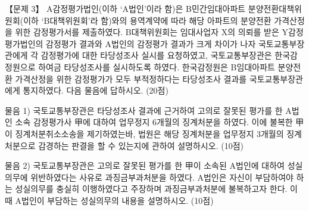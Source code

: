 \begin{longquestion}{【문제 3】}
A감정평가법인(이하 ‘A법인’이라 함)은 B민간임대아파트 분양전환대책위원회(이하 ‘B대책위원회’라 함)와의 용역계약에 따라 해당 아파트의 분양전환 가격산정을 위한 감정평가서를 제출하였다. B대책위원회는 임대사업자 X의 의뢰를 받은 Y감정평가법인의 감정평가 결과와 A법인의 감정평가 결과가 크게 차이가 나자 국토교통부장관에게 각 감정평가에 대한 타당성조사 실시를 요청하였고, 국토교통부장관은 한국감정원으로 하여금 타당성조사를 실시하도록 하였다. 한국감정원은 B임대아파트 분양전환 가격산정을 위한 감정평가가 모두 부적정하다는 타당성조사 결과를 국토교통부장관에게 통지하였다. 다음 물음에 답하시오. (20점) \par
\medskip\noindent 물음 1) 국토교통부장관은 타당성조사 결과에 근거하여 고의로 잘못된 평가를 한 A법인 소속 감정평가사 甲에 대하여 업무정지 6개월의 징계처분을 하였다. 이에 불복한 甲이 징계처분취소소송을 제기하였는바, 법원은 해당 징계처분을 업무정지 3개월의 징계처분으로 감경하는 판결을 할 수 있는지에 관하여 설명하시오. (10점) \par
\medskip\noindent 물음 2) 국토교통부장관은 고의로 잘못된 평가를 한 甲이 소속된 A법인에 대하여 성실의무에 위반하였다는 사유로 과징금부과처분을 하였다. A법인은 자신이 부담하여야 하는 성실의무를 충실히 이행하였다고 주장하며 과징금부과처분에 불복하고자 한다. 이때 A법인이 부담하는 성실의무의 내용을 설명하시오. (10점) \par
\end{longquestion}
